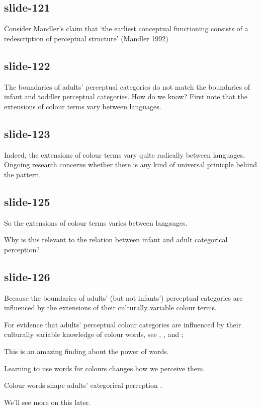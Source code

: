 \documentclass[12pt,\papersize]{extarticle}
\begin{document}
\subsection{slide-121}
Consider Mandler's claim that
‘the earliest conceptual functioning consists of a redescription of perceptual structure’ (Mandler 1992)

\subsection{slide-122}
The boundaries of adults' perceptual categories do not match the boundaries of infant and toddler perceptual categories.
How do we know?
First note that the extensions of colour terms vary between languages.

\subsection{slide-123}
Indeed, the extensions of colour terms vary quite radically between languages.
Ongoing research concerns whether there is any kind of universal prinicple behind the pattern.

\subsection{slide-125}
So the extensions of colour terms varies between langauges.

Why is this relevant to the relation between infant and adult categorical perception?

\subsection{slide-126}
Because the boundaries of adults' (but not infants') perceptual categories are
influenced by the extensions of their culturally variable colour terms.

For evidence that adults' perceptual colour categories are influenced by their
culturally variable knowledge of colour words, see \citet{Kay:2006ly},
\citet{Roberson:2007wg}, and \citet{Winawer:2007im};

This is an amazing finding about the power of words.

Learning to use words for colours changes how we perceive them.

Colour words shape adults’ categorical perception \citep{Roberson:2007wg,Winawer:2007im}.

We'll see more on this later.
\end{document}
